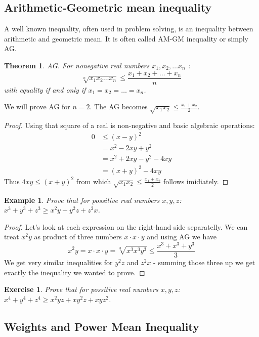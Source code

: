 \documentclass[11pt,a5paper]{article}
\newtheorem{theorem}{Example}
\newtheorem{exercise}{Exercise}
\newtheorem*{Theorem}{Theorem}
\begin{document}
\subsection*{Arithmetic-Geometric mean inequality}

A well known inequality, often used in problem solving, is an 
inequality between arithmetic and geometric mean. It is often 
called AM-GM inequality or simply AG.

\begin{Theorem} \emph{AG.}
For nonegative real numbers $x_1, x_2, \dots x_n$ : 
\[\sqrt[n]{x_1x_2\dots x_n} \le  \frac{x_1 + x_2 + \dots + x_n}{n}\] 
with equality if and only if $x_1 = x_2 = \dots = x_n$. \\
\end{Theorem}

\noindent We will prove AG for $n=2$. The AG becomes 
$\sqrt{x_1x_2} \le  \frac{x_1 + x_2}{2}$. 
\begin{proof} Using that square of a real is non-negative and basic 
algebraic operations:
	\begin{align*}
	0 & \le (x-y)^2 \\
	 & = x^2 - 2xy + y^2 \\
	 & = x^2 + 2xy - y^2 -4xy \\
	 & = (x+y)^2 - 4xy 
	\end{align*}
	Thus $4xy \le (x+y)^2$ from which 
	$\sqrt{x_1x_2} \le  \frac{x_1 + x_2}{2}$ follows imidiately. 
\end{proof}

\begin{theorem}
	Prove that for possitive real numbers $x, y, z$: 
	$x^3 + y^3 + z^3 \ge x^2y + y^2z + z^2x$.
\end{theorem}

\begin{proof} Let's look at each expression on the right-hand side 
separatelly. We can treat $x^2y$ as product of three numbers 
$x\cdot x\cdot y$ and using AG we have 
\[x^2y = x\cdot x\cdot y = \sqrt[3]{x^3x^3y^3} \le\frac{x^3 + x^3 + y^3}{3}\]
We get very similar inequalities for $y^2z$ and $z^2x$ - summing 
those three up we get exactly the inequality we wanted to prove.
\end{proof}

\begin{exercise} Prove that for possitive real numbers $x, y, z$: 
$x^4 + y^4 + z^4 \ge x^2yz + xy^2z + xyz^2$.
\end{exercise}

\subsection*{Weights and Power Mean Inequality}
\end{document}
